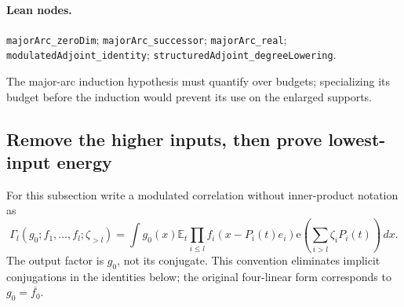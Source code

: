 \documentclass[11pt]{article}
\theoremstyle{definition}
\newcommand{\ee}[1]{\mathrm e\!\left(#1\right)}
\newcommand{\pid}[1]{\nolinkurl{#1}}
\begin{document}
\paragraph{Lean nodes.}
\mbox{}\par
{\small\raggedright
\pid{majorArc_zeroDim}; \pid{majorArc_successor}; \pid{majorArc_real};
\pid{modulatedAdjoint_identity}; \pid{structuredAdjoint_degreeLowering}.
\par}
The major-arc induction hypothesis must quantify over budgets; specializing its budget
before the induction would prevent its use on the enlarged supports.


\subsection{Remove the higher inputs, then prove lowest-input energy}
\label{patch:lowest-inverse}
For this subsection write a modulated correlation without inner-product notation as
\[
 \Gamma_l(g_0;f_1,\ldots,f_l;\zeta_{>l})
 =\int g_0(x)\mathbb E_t\prod_{i\leq l}f_i(x-P_i(t)e_i)
                   \ee{\sum_{i>l}\zeta_iP_i(t)}\,dx.
\]
The output factor is $g_0$, not its conjugate.  This convention eliminates implicit
conjugations in the identities below; the original four-linear form corresponds to
$g_0=\overline{f_0}$.
\end{document}
